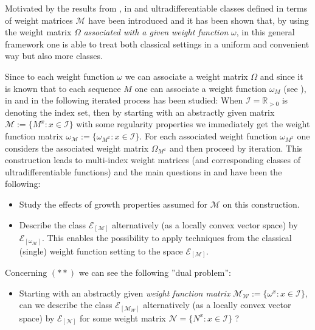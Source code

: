 \documentclass[10pt]{amsart}%
\numberwithin{equation}{section}
\theoremstyle{plain}
\newcommand{\RR}{\mathbb{R}}
\begin{document}
Motivated by the results from \cite{BonetMeiseMelikhov07}, in \cite{dissertation} and \cite{compositionpaper} ultradifferentiable classes defined in terms of weight matrices $\mathcal{M}$ have been introduced and it has been shown that, by using the weight matrix $\Omega$ {\itshape associated with a given weight function} $\omega$, in this general framework one is able to treat both classical settings in a uniform and convenient way but also more classes.\vspace{6pt}

Since to each weight function $\omega$ we can associate a weight matrix $\Omega$ and since it is known that to each sequence $M$ one can associate a weight function $\omega_M$ (see \cite[Chapitre I]{mandelbrojtbook}), in \cite[Sect. 9.3]{dissertation} and in \cite{testfunctioncharacterization} the following iterated process has been studied: When $\mathcal{I}=\RR_{>0}$ is denoting the index set, then by starting with an abstractly given matrix $\mathcal{M}:=\{M^x: x\in\mathcal{I}\}$ with some regularity properties we immediately get the weight function matrix $\omega_{\mathcal{M}}:=\{\omega_{M^x}: x\in\mathcal{I}\}$. For each associated weight function $\omega_{M^x}$ one considers the associated weight matrix ${\Omega_{M^x}}$ and then proceed by iteration. This construction leads to multi-index weight matrices (and corresponding classes of ultradifferentiable functions) and the main questions in \cite[Sect. 9.3]{dissertation} and \cite{testfunctioncharacterization} have been the following:

\begin{itemize}
\item[$(*)$] Study the effects of growth properties assumed for $\mathcal{M}$ on this construction.

\item[$(**)$] Describe the class $\mathcal{E}_{[\mathcal{M}]}$ alternatively (as a locally convex vector space) by $\mathcal{E}_{[\omega_{\mathcal{M}}]}$. This enables the possibility to apply techniques from the classical (single) weight function setting to the space $\mathcal{E}_{[\mathcal{M}]}$.
\end{itemize}

Concerning $(**)$ we can see the following ''dual problem'':

\begin{itemize}
\item[$(**)'$] Starting with an abstractly given {\itshape weight function matrix} $\mathcal{M}_{\mathcal{W}}:=\{\omega^x: x\in\mathcal{I}\}$, can we describe the class $\mathcal{E}_{[\mathcal{M}_{\mathcal{W}}]}$ alternatively (as a locally convex vector space) by $\mathcal{E}_{[\mathcal{N}]}$ for some weight matrix $\mathcal{N}=\{N^x: x\in\mathcal{I}\}$ ?
\end{itemize}
\end{document}
